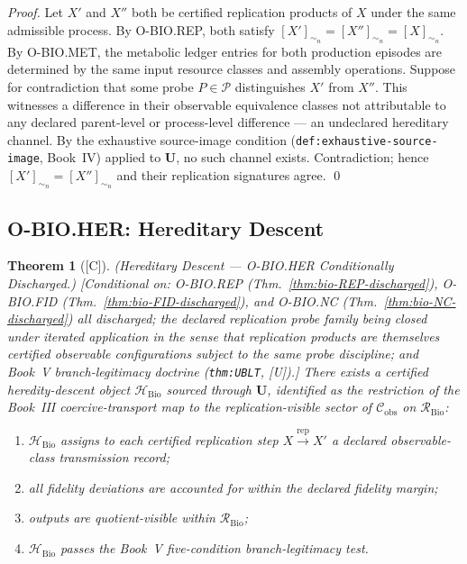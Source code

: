 \documentclass[12pt,oneside]{amsbook}
\theoremstyle{plain}
\newtheorem{theorem}{Theorem}[section]
\theoremstyle{definition}
\theoremstyle{remark}
\newcommand{\status}[1]{\textup{[#1]}}
\begin{document}
\begin{proof}
Let $X'$ and $X''$ both be certified replication products of $X$
under the same admissible process. By O-BIO.REP, both satisfy
$[X']_{\sim_n} = [X'']_{\sim_n} = [X]_{\sim_n}$. By O-BIO.MET,
the metabolic ledger entries for both production episodes are
determined by the same input resource classes and assembly operations.
Suppose for contradiction that some probe $P \in \mathcal{P}$
distinguishes $X'$ from $X''$. This witnesses a difference in their
observable equivalence classes not attributable to any declared
parent-level or process-level difference --- an undeclared hereditary
channel. By the exhaustive source-image condition
(\texttt{def:exhaustive-source-image}, Book~IV) applied to
$\mathbf{U}$, no such channel exists. Contradiction; hence
$[X']_{\sim_n} = [X'']_{\sim_n}$ and their replication signatures
agree.
\qed
\end{proof}

\subsection{O-BIO.HER: Hereditary Descent}\label{sec:bio-HER-discharge}

\begin{theorem}[\status{C}]\label{thm:bio-HER-discharged}
\textup{(Hereditary Descent --- O-BIO.HER Conditionally Discharged.)}
\textup{[Conditional on: O-BIO.REP (Thm.~\ref{thm:bio-REP-discharged}),
O-BIO.FID (Thm.~\ref{thm:bio-FID-discharged}), and O-BIO.NC
(Thm.~\ref{thm:bio-NC-discharged}) all discharged; the declared
replication probe family being closed under iterated application in
the sense that replication products are themselves certified observable
configurations subject to the same probe discipline; and Book~V
branch-legitimacy doctrine (\texttt{thm:UBLT}, [U]).]}
There exists a certified heredity-descent object
$\mathcal{H}_{\mathrm{Bio}}$ sourced through $\mathbf{U}$, identified
as the restriction of the Book~III coercive-transport map to the
replication-visible sector of $\mathcal{C}_{\mathrm{obs}}$ on
$\mathcal{R}_{\mathrm{Bio}}$:
\begin{enumerate}[label=\textup{(\arabic*)}]
 \item $\mathcal{H}_{\mathrm{Bio}}$ assigns to each certified
 replication step $X \xrightarrow{\mathrm{rep}} X'$ a declared
 observable-class transmission record;
 \item all fidelity deviations are accounted for within the declared
 fidelity margin;
 \item outputs are quotient-visible within $\mathcal{R}_{\mathrm{Bio}}$;
 \item $\mathcal{H}_{\mathrm{Bio}}$ passes the Book~V five-condition
 branch-legitimacy test.
\end{enumerate}
\end{theorem}
\end{document}

